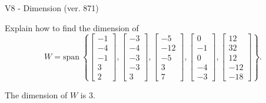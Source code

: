 \begin{exercise}
  \begin{exerciseTitle}V8 - Dimension (ver. 871)\end{exerciseTitle}
  \begin{exerciseStatement}
    Explain how to find the dimension of 
\[W=\mathrm{span}\ \left\{\left[\begin{array}{r}
-1 \\
-4 \\
-1 \\
3 \\
2
\end{array}\right] , \left[\begin{array}{r}
-3 \\
-4 \\
-3 \\
-3 \\
3
\end{array}\right] , \left[\begin{array}{r}
-5 \\
-12 \\
-5 \\
3 \\
7
\end{array}\right] , \left[\begin{array}{r}
0 \\
-1 \\
0 \\
-4 \\
-3
\end{array}\right] , \left[\begin{array}{r}
12 \\
32 \\
12 \\
-12 \\
-18
\end{array}\right]\right\}.\]



  \end{exerciseStatement}
  \begin{exerciseAnswer}
   The dimension of \(W\) is  \(3\).
  


  \end{exerciseAnswer}
\end{exercise}